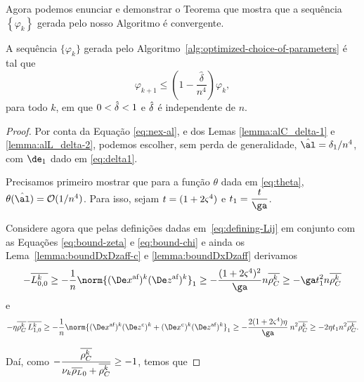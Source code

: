 Agora podemos enunciar e demonstrar o Teorema que mostra que a sequência $\left\{ \varphi_{k}\right\}$ gerada pelo nosso Algoritmo é convergente. 

\begin{teo}\label{teo:next-phi-delta-n4}
A sequência $\{\varphi_{k}\}$ gerada pelo Algoritmo~\ref{alg:optimized-choice-of-parameters} é tal que
\begin{equation}
		\label{eq:varphi-delta-n4}
				\varphi_{k+1}\leq \left(1 - \frac{\hat{\delta}}{n^{4}}\right)\varphi_{k},
	\end{equation}
	para todo $k$, em que $0<\hat{\delta}<1$ e $\hat{\delta}$ é independente de $n$.
\end{teo}


\begin{proof} Por conta da Equação \eqref{eq:nex-al}, e dos Lemas \ref{lemma:alC_delta-1} e \ref{lemma:alL_delta-2}, podemos escolher, sem perda de generalidade, $\nextal = \delta_{1}/n^{4}$, com $\de_{1}$ dado em \eqref{eq:delta1}. 

Precisamos  primeiro mostrar que para a função $\theta$ dada em \eqref{eq:theta},  $\theta(\nextal)= \Oset(1/n^{4})$. Para isso, sejam $t = (1+2\varsigma^{4})$ e $t_1 = \dfrac{t}{\ga}$.  

Considere agora que pelas definições  dadas em~\eqref{eq:defining-Lij} em conjunto com  as Equações  \eqref{eq:bound-zeta} e \eqref{eq:bound-chi} e ainda  os Lema~\ref{lemma:boundDxDzaff-c} e \ref{lemma:boundDxDzaff} derivamos 
\[
- \dbvec{L_{0,0}^{k}} \geq - \dfrac{1}{n} \norm{ \dekx  \dekz }_1 \geq - \dfrac{(1 + 2\bdxzstar^{4})^{2} }{\ga} n\rhoCkb \geq -\ga t_{1}^{2}n\rhoCkb
\]
e 
\[
- \eta\rhoCkb\,  \dbvec{L_{1,0}^{k}} \geq - \dfrac{1}{n} \norm{ \dekx \Dekcoz + \Dekcox \dekz }_1 \geq - \dfrac{2(1+2\bdxzstar^{4})\eta }{\ga}\: n^{2}\rhoCkb\geq - 2\eta t_{1} n^{2}\rhoCkb.
\]




Daí, como $-\dfrac{\overline{\rho_C^{k}} }{\nu_{k} \overline{\rho_L}_0 + \overline{\rho_C^{k}} }\geq - 1$, temos que




\end{proof}
